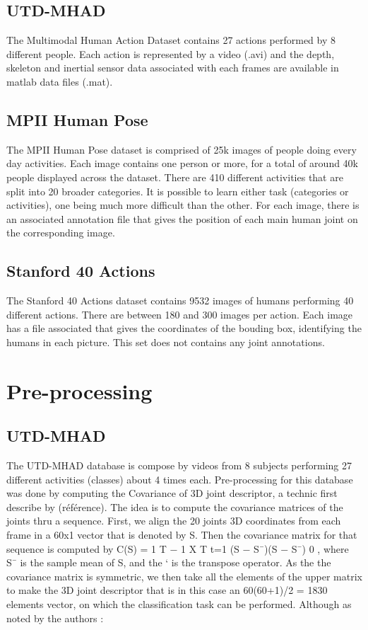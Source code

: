 \documentclass{article}
\begin{document}
\subsection{UTD-MHAD}
The Multimodal Human Action Dataset contains 27 actions performed by 8 different people. Each action is represented by a video (.avi) and the depth, skeleton and inertial sensor data associated with each frames are available in matlab data files (.mat).
\subsection{MPII Human Pose}
The MPII Human Pose dataset is comprised of 25k images of people doing every day activities. Each image contains one person or more, for a total of around 40k people displayed across the dataset. There are 410 different activities that are split into 20 broader categories. It is possible to learn either task (categories or activities), one being much more difficult than the other. For each image, there is an associated annotation file that gives the position of each main human joint on the corresponding image.
\subsection{Stanford 40 Actions}
The Stanford 40 Actions dataset contains 9532 images of humans performing 40 different actions. There are between 180 and 300 images per action. Each image has a file associated that gives the coordinates of the bouding box, identifying the humans in each picture. This set does not contains any joint annotations.

\section{Pre-processing}
\subsection{UTD-MHAD}
The UTD-MHAD database is compose by videos from 8 subjects performing 27 different activities (classes) about 4 times each. Pre-processing for this database was done by computing the Covariance of 3D joint descriptor, a technic first describe by (référence).  The idea is to compute the covariance matrices of the joints thru a sequence.  First, we align the 20 joints 3D coordinates from each frame in a 60x1 vector that is denoted by S.  Then the covariance matrix for that sequence is computed by   C(S) = 1 T − 1 X T t=1 (S − S¯)(S − S¯) 0 , where S¯ is the sample mean of S, and the ‘ is the transpose operator.  As the the covariance matrix is symmetric, we then take all the elements of the upper matrix to make the 3D joint descriptor that is in this case an 60(60+1)/2 = 1830 elements vector, on which the classification task can be performed.   Although as noted by the authors :
\end{document}
